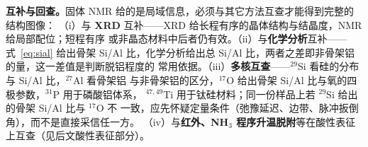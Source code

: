 \begin{crosscheck}
\textbf{互补与回查。}固体 NMR 给的是局域信息，必须与其它方法互查才能得到完整的结构图像：
（i）与 \textbf{XRD} 互补——XRD 给长程有序的晶体结构与结晶度，NMR 给局部配位；短程有序
或非晶态材料中后者仍有效。（ii）与\textbf{化学分析}互补——式~\eqref{eq:sial} 给出骨架
Si/Al 比，化学分析给出总 Si/Al 比，两者之差即非骨架铝的量，这一差值是判断脱铝程度的
常用依据。（iii）\textbf{多核互查}——$^{29}$Si 看硅的分布与 Si/Al 比，$^{27}$Al 看骨架铝
与非骨架铝的区分，$^{17}$O 给出骨架 Si/Al 比与氧的四极参数，$^{31}$P 用于磷酸铝体系，
$^{47,49}$Ti 用于钛硅材料；同一份样品上若 $^{29}$Si 给出的骨架 Si/Al 比与 $^{17}$O 不
一致，应先怀疑定量条件（弛豫延迟、边带、脉冲扳倒角），而不是直接采信任一方。
（iv）与\textbf{红外、NH$_3$ 程序升温脱附}等在酸性表征上互查（见后文酸性表征部分）。
\end{crosscheck}
